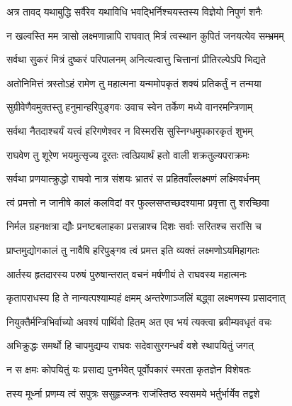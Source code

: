 \twolineshloka
{अत्र तावद् यथाबुद्धि सर्वैरेव यथाविधि}
{भवद्भिर्निश्चयस्तस्य विज्ञेयो निपुणं शनैः} %

\twolineshloka
{न खल्वस्ति मम त्रासो लक्ष्मणान्नापि राघवात्}
{मित्रं त्वस्थान कुपितं जनयत्येव सम्भ्रमम्} %

\twolineshloka
{सर्वथा सुकरं मित्रं दुष्करं परिपालनम्}
{अनित्यत्वात्तु चित्तानां प्रीतिरल्पेऽपि भिद्यते} %

\twolineshloka
{अतोनिमित्तं त्रस्तोऽहं रामेण तु महात्मना}
{यन्ममोपकृतं शक्यं प्रतिकर्तुं न तन्मया} %

\twolineshloka
{सुग्रीवेणैवमुक्तस्तु हनुमान्हरिपुङ्गवः}
{उवाच स्वेन तर्केण मध्ये वानरमन्त्रिणाम्} %

\twolineshloka
{सर्वथा नैतदाश्चर्यं यत्त्वं हरिगणेश्वर}
{न विस्मरसि सुस्निग्धमुपकारकृतं शुभम्} %

\twolineshloka
{राघवेण तु शूरेण भयमुत्सृज्य दूरतः}
{त्वत्प्रियार्थं हतो वाली शक्रतुल्यपराक्रमः} %

\twolineshloka
{सर्वथा प्रणयात्क्रुद्धो राघवो नात्र संशयः}
{भ्रातरं स प्रहितवाँल्लक्ष्मणं लक्ष्मिवर्धनम्} %

\twolineshloka
{त्वं प्रमत्तो न जानीषे कालं कलविदां वर}
{फुल्लसप्तच्छदश्यामा प्रवृत्ता तु शरच्छिवा} %

\twolineshloka
{निर्मल ग्रहनक्षत्रा द्यौः प्रनष्टबलाहका}
{प्रसन्नाश्च दिशः सर्वाः सरितश्च सरांसि च} %

\twolineshloka
{प्राप्तमुद्योगकालं तु नावैषि हरिपुङ्गव}
{त्वं प्रमत्त इति व्यक्तं लक्ष्मणोऽयमिहागतः} %

\twolineshloka
{आर्तस्य हृतदारस्य परुषं पुरुषान्तरात्}
{वचनं मर्षणीयं ते राघवस्य महात्मनः} %

\twolineshloka
{कृतापराधस्य हि ते नान्यत्पश्याम्यहं क्षमम्}
{अन्तरेणाञ्जलिं बद्ध्वा लक्ष्मणस्य प्रसादनात्} %

\twolineshloka
{नियुक्तैर्मन्त्रिभिर्वाच्यो अवश्यं पार्थिवो हितम्}
{अत एव भयं त्यक्त्वा ब्रवीम्यवधृतं वचः} %

\twolineshloka
{अभिक्रुद्धः समर्थो हि चापमुद्यम्य राघवः}
{सदेवासुरगन्धर्वं वशे स्थापयितुं जगत्} %

\twolineshloka
{न स क्षमः कोपयितुं यः प्रसाद्य पुनर्भवेत्}
{पूर्वोपकारं स्मरता कृतज्ञेन विशेषतः} %

\twolineshloka
{तस्य मूर्ध्ना प्रणम्य त्वं सपुत्रः ससुहृज्जनः}
{राजंस्तिष्ठ स्वसमये भर्तुर्भार्येव तद्वशे} %

